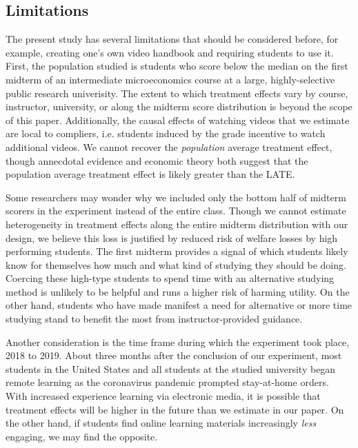 \documentclass[12pt]{article}
\begin{document}
\subsection{Limitations}

The present study has several limitations that should be considered before, for example, creating one's own video handbook and requiring students to use it. First, the population studied is students who score below the median on the first midterm of an intermediate microeconomics course at a large, highly-selective public research univerisity. The extent to which treatment effects vary by course, instructor, university, or along the midterm score distribution is beyond the scope of this paper. Additionally, the causal effects of watching videos that we estimate are local to compliers, i.e. students induced by the grade incentive to watch additional videos. We cannot recover the \textit{population} average treatment effect, though annecdotal evidence and economic theory both suggest that the population average treatment effect is likely greater than the LATE.%

Some researchers may wonder why we included only the bottom half of midterm scorers in the experiment instead of the entire class. Though we cannot estimate heterogeneity in treatment effects along the entire midterm distribution with our design, we believe this loss is justified by reduced risk of welfare losses by high performing students. The first midterm provides a signal of which students likely know for themselves how much and what kind of studying they should be doing. Coercing these high-type students to spend time with an alternative studying method is unlikely to be helpful and runs a higher risk of harming utility. On the other hand, students who have made manifest a need for alternative or more time studying stand to benefit the most from instructor-provided guidance.

Another consideration is the time frame during which the experiment took place, 2018 to 2019. About three months after the conclusion of our experiment, most students in the United States and all students at the studied university began remote learning as the coronavirus pandemic prompted stay-at-home orders. With increased experience learning via electronic media, it is possible that treatment effects will be higher in the future than we estimate in our paper. On the other hand, if students find online learning materials increasingly \textit{less} engaging, we may find the opposite.
\end{document}
